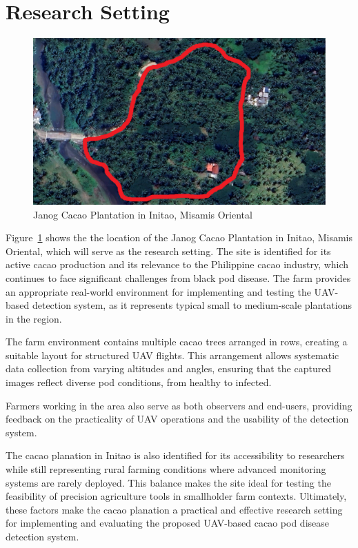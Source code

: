 \section{Research Setting}

\begin{figure}[H]
	\centering
	\caption{Janog Cacao Plantation in Initao, Misamis Oriental}
	\label{fig:cacao_farm}
	\includegraphics[width=1\textwidth]{figures/Cacao_Farm.pdf}
\end{figure}

Figure~\ref{fig:cacao_farm} shows the the location of the Janog Cacao Plantation in Initao, Misamis Oriental, which will serve as the research setting. 
The site is identified for its active cacao production and its relevance to the Philippine cacao industry, which continues to face significant challenges from black pod disease. 
The farm provides an appropriate real-world environment for implementing and testing the UAV-based detection system, as it represents typical small to medium-scale plantations in the region.

The farm environment contains multiple cacao trees arranged in rows, creating a suitable layout for structured UAV flights. 
This arrangement allows systematic data collection from varying altitudes and angles, ensuring that the captured images reflect diverse pod conditions, from healthy to infected. 

Farmers working in the area also serve as both observers and end-users, providing feedback on the practicality of UAV operations and the usability of the detection system.

The cacao planation in Initao is also identified for its accessibility to researchers while still representing rural farming conditions where advanced monitoring systems are rarely deployed. 
This balance makes the site ideal for testing the feasibility of precision agriculture tools in smallholder farm contexts. 
Ultimately, these factors make the cacao planation a practical and effective research setting for implementing and evaluating the proposed UAV-based cacao pod disease detection system.


